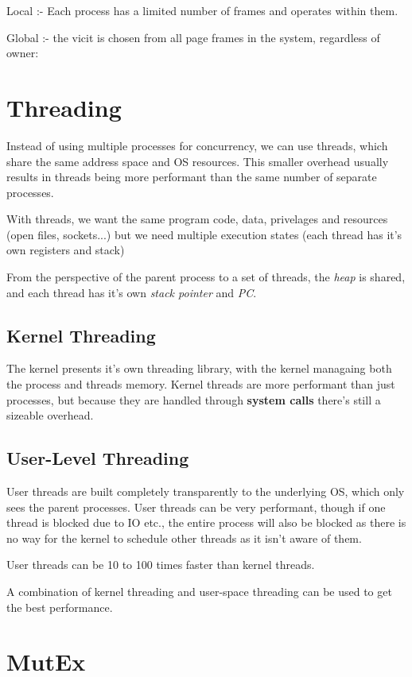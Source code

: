 \documentclass[a4]{article}
\begin{document}
Local :- Each process has a limited number of frames and operates within them.

Global :- the vicit is chosen from all page frames in the system, regardless of owner:


\filbreak
\section{Threading}

Instead of using multiple processes for concurrency, we can use threads, which share the same address
space and OS resources. This smaller overhead usually results in threads being more performant than
the same number of separate processes.

With threads, we want the same program code, data, privelages and resources (open files, sockets...) but
we need multiple execution states (each thread has it's own registers and stack)

From the perspective of the parent process to a set of threads, the \emph{heap} is shared, and each thread has
it's own \emph{stack pointer} and \emph{PC}.

\subsection{Kernel Threading}

The kernel presents it's own threading library, with the kernel managaing both the process and threads memory.
Kernel threads are more performant than just processes, but because they are handled through \textbf{system calls}
there's still a sizeable overhead.

\subsection{User-Level Threading}

User threads are built completely transparently to the underlying OS, which only sees the parent processes. User
threads can be very performant, though if one thread is blocked due to IO etc., the entire process will also be
blocked as there is no way for the kernel to schedule other threads as it isn't aware of them.

User threads can be 10 to 100 times faster than kernel threads.

A combination of kernel threading and user-space threading can be used to get the best performance.


\filbreak
\section{MutEx}\label{mutex}
\end{document}
